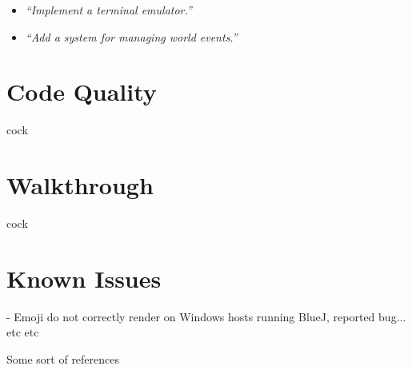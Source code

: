 \documentclass{article}
\begin{document}
\begin{multicols}{2}
\begin{itemize}[leftmargin=*]
                    \item \textit{``Implement a terminal emulator.''}
                
                    \item \textit{``Add a system for managing world events.''}
            \end{itemize}

        \section{Code Quality}
        cock

        \section{Walkthrough}
        cock

        \section{Known Issues}
        - Emoji do not correctly render on Windows hosts running BlueJ, reported bug... etc etc
    \end{multicols}

    \begin{thebibliography}{9}
        Some sort of references
    \end{thebibliography}        
\end{document}

